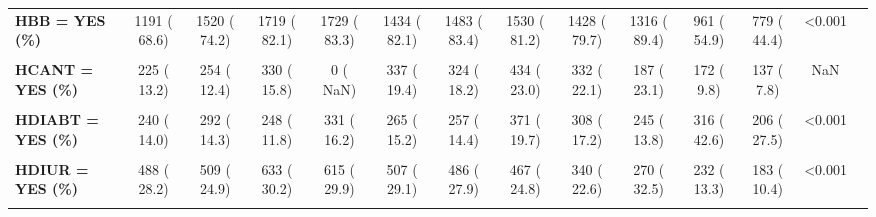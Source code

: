 \documentclass[
]{article}
\begin{document}
\begin{table}[H]
\begin{tabular}[t]{>{\raggedright\arraybackslash}p{5em}ccccccccccccc}
\textbf{HBB = YES (\%)} & 1191 ( 68.6) & 1520 ( 74.2) & 1719 ( 82.1) & 1729 ( 83.3) & 1434 ( 82.1) & 1483 ( 83.4) & 1530 ( 81.2) & 1428 ( 79.7) & 1316 ( 89.4) & 961 ( 54.9) & 779 ( 44.4) & <0.001 & \\
\textbf{\cellcolor{gray!10}{HCABG = YES (\%)}} & \cellcolor{gray!10}{116 (  6.7)} & \cellcolor{gray!10}{145 (  7.1)} & \cellcolor{gray!10}{129 (  6.2)} & \cellcolor{gray!10}{78 (  3.8)} & \cellcolor{gray!10}{68 (  3.9)} & \cellcolor{gray!10}{30 (  1.7)} & \cellcolor{gray!10}{88 (  4.7)} & \cellcolor{gray!10}{62 (  3.5)} & \cellcolor{gray!10}{62 (  3.5)} & \cellcolor{gray!10}{116 (  6.7)} & \cellcolor{gray!10}{114 (  6.6)} & \cellcolor{gray!10}{<0.001} & \cellcolor{gray!10}{}\\
\textbf{HCANT = YES (\%)} & 225 ( 13.2) & 254 ( 12.4) & 330 ( 15.8) & 0 (  NaN) & 337 ( 19.4) & 324 ( 18.2) & 434 ( 23.0) & 332 ( 22.1) & 187 ( 23.1) & 172 (  9.8) & 137 (  7.8) & NaN & \\
\textbf{\cellcolor{gray!10}{HDCS = YES (\%)}} & \cellcolor{gray!10}{107 (  6.2)} & \cellcolor{gray!10}{48 (  2.3)} & \cellcolor{gray!10}{63 (  3.0)} & \cellcolor{gray!10}{82 (  4.0)} & \cellcolor{gray!10}{52 (  3.0)} & \cellcolor{gray!10}{69 (  3.9)} & \cellcolor{gray!10}{39 (  2.1)} & \cellcolor{gray!10}{40 (  2.2)} & \cellcolor{gray!10}{37 (  2.1)} & \cellcolor{gray!10}{49 (  2.8)} & \cellcolor{gray!10}{55 (  3.2)} & \cellcolor{gray!10}{<0.001} & \cellcolor{gray!10}{}\\
\textbf{HDIABT = YES (\%)} & 240 ( 14.0) & 292 ( 14.3) & 248 ( 11.8) & 331 ( 16.2) & 265 ( 15.2) & 257 ( 14.4) & 371 ( 19.7) & 308 ( 17.2) & 245 ( 13.8) & 316 ( 42.6) & 206 ( 27.5) & <0.001 & \\
\textbf{\cellcolor{gray!10}{HDIGIT = YES (\%)}} & \cellcolor{gray!10}{56 (  3.3)} & \cellcolor{gray!10}{48 (  2.3)} & \cellcolor{gray!10}{72 (  3.4)} & \cellcolor{gray!10}{56 (  2.7)} & \cellcolor{gray!10}{38 (  2.2)} & \cellcolor{gray!10}{25 (  1.4)} & \cellcolor{gray!10}{20 (  1.1)} & \cellcolor{gray!10}{19 (  1.3)} & \cellcolor{gray!10}{11 (  1.6)} & \cellcolor{gray!10}{4 (  0.2)} & \cellcolor{gray!10}{5 (  0.3)} & \cellcolor{gray!10}{<0.001} & \cellcolor{gray!10}{}\\
\textbf{HDIUR = YES (\%)} & 488 ( 28.2) & 509 ( 24.9) & 633 ( 30.2) & 615 ( 29.9) & 507 ( 29.1) & 486 ( 27.9) & 467 ( 24.8) & 340 ( 22.6) & 270 ( 32.5) & 232 ( 13.3) & 183 ( 10.4) & <0.001 & \\
\textbf{\cellcolor{gray!10}{HECHO = YES (\%)}} & \cellcolor{gray!10}{1227 ( 69.7)} & \cellcolor{gray!10}{1403 ( 68.5)} & \cellcolor{gray!10}{1655 ( 79.0)} & \cellcolor{gray!10}{1746 ( 84.4)} & \cellcolor{gray!10}{1390 ( 79.7)} & \cellcolor{gray!10}{1420 ( 79.8)} & \cellcolor{gray!10}{1485 ( 79.7)} & \cellcolor{gray!10}{1055 ( 59.0)} & \cellcolor{gray!10}{1207 ( 68.0)} & \cellcolor{gray!10}{1618 ( 93.4)} & \cellcolor{gray!10}{1551 ( 94.1)} & \cellcolor{gray!10}{<0.001} & \cellcolor{gray!10}{}\\

\end{tabular}
\end{table}
\end{document}

